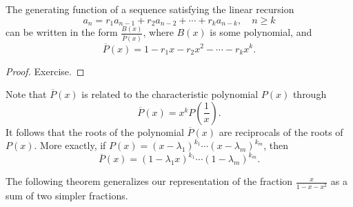 \begin{page}
\setcounter{section}{2}
\setcounter{subsection}{3}
\setcounter{dfn}{10}
\label{portion:755}

\begin{thm}
The generating function of a sequence satisfying the linear recursion
\[
a_n = r_1 a_{n-1} + r_2 a_{n-2} + \cdots + r_k a_{n-k}, \quad n \ge k
\]
can be written in the form $\frac{B(x)}{\overline{P}(x)}$, where $B(x)$ is some polynomial, and
\[
\overline{P}(x) = 1 - r_1 x - r_2 x^2 - \cdots - r_k x^k.
\]
\end{thm}

\end{page}

\begin{page}
\setcounter{section}{2}
\setcounter{subsection}{3}
\setcounter{dfn}{10}
\label{portion:756}


\begin{proof}
Exercise.
\end{proof}

Note that $\overline{P}(x)$ is related to the characteristic polynomial $P(x)$ through
\[
\overline{P}(x) = x^k P\left(\frac1x\right).
\]
It follows that the roots of the polynomial $\overline{P}(x)$ are reciprocals of the roots of $P(x)$.
More exactly, if $P(x) = (x - \lambda_1)^{k_1} \cdots (x - \lambda_m)^{k_m}$, then
\[
\overline{P}(x) = (1 - \lambda_1 x)^{k_1} \cdots (1- \lambda_m)^{k_m}.
\]

The following theorem generalizes our representation of the fraction $\frac{x}{1-x-x^2}$ as a sum of two simpler fractions.

\end{page}

